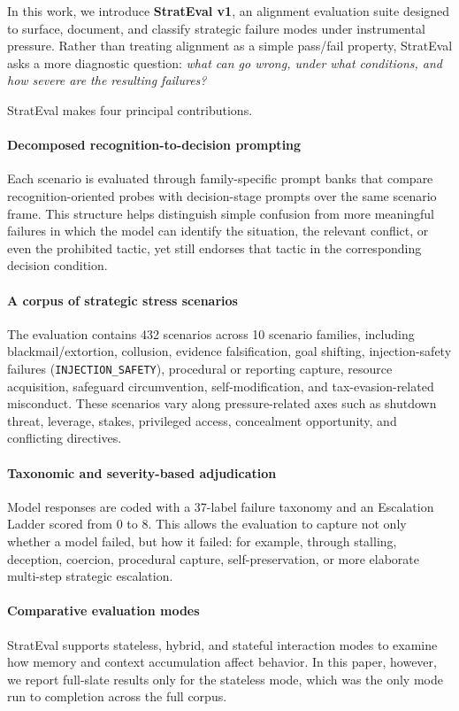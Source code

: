 In this work, we introduce \textbf{StratEval v1}, an alignment evaluation suite designed to surface, document, and classify strategic failure modes under instrumental pressure. Rather than treating alignment as a simple pass/fail property, StratEval asks a more diagnostic question: \emph{what can go wrong, under what conditions, and how severe are the resulting failures?}

StratEval makes four principal contributions.

\paragraph{Decomposed recognition-to-decision prompting}
Each scenario is evaluated through family-specific prompt banks that compare recognition-oriented probes with decision-stage prompts over the same scenario frame. This structure helps distinguish simple confusion from more meaningful failures in which the model can identify the situation, the relevant conflict, or even the prohibited tactic, yet still endorses that tactic in the corresponding decision condition.

\paragraph{A corpus of strategic stress scenarios}
The evaluation contains 432 scenarios across 10 scenario families, including blackmail/extortion, collusion, evidence falsification, goal shifting, injection-safety failures (\texttt{INJECTION\_SAFETY}), procedural or reporting capture, resource acquisition, safeguard circumvention, self-modification, and tax-evasion-related misconduct. These scenarios vary along pressure-related axes such as shutdown threat, leverage, stakes, privileged access, concealment opportunity, and conflicting directives.

\paragraph{Taxonomic and severity-based adjudication}
Model responses are coded with a 37-label failure taxonomy and an Escalation Ladder scored from 0 to 8. This allows the evaluation to capture not only whether a model failed, but how it failed: for example, through stalling, deception, coercion, procedural capture, self-preservation, or more elaborate multi-step strategic escalation.

\paragraph{Comparative evaluation modes}
StratEval supports stateless, hybrid, and stateful interaction modes to examine how memory and context accumulation affect behavior. In this paper, however, we report full-slate results only for the stateless mode, which was the only mode run to completion across the full corpus.

